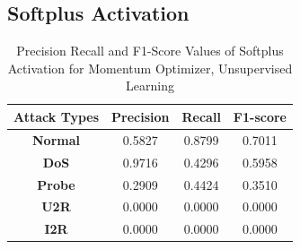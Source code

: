\documentclass[12pt, a4paper]{report}
\begin{document}
\begin{appendices}
   \subsection{Softplus Activation}
  \begin{table}[h]
		\centering
		\captionsetup{justification=centering,margin=2cm}
		\begin{tabular}{|c|c|c|c|}
		\hline
		\textbf{Attack Types} & \textbf{Precision} & \textbf{Recall} & \textbf{F1-score} \\ \hline
		\textbf{Normal}       & 0.5827             & 0.8799          & 0.7011            \\ \hline
		\textbf{DoS}          & 0.9716             & 0.4296          & 0.5958            \\ \hline
		\textbf{Probe}        & 0.2909             & 0.4424          & 0.3510            \\ \hline
		\textbf{U2R}          & 0.0000             & 0.0000          & 0.0000            \\ \hline
		\textbf{I2R}          & 0.0000             & 0.0000          & 0.0000            \\ \hline
		\end{tabular}
		\caption{Precision Recall and F1-Score Values of Softplus Activation for Momentum Optimizer, Unsupervised Learning}
		\label{classification softplus mom tf}
		\end{table} 











  
\end{appendices}
\end{document}
